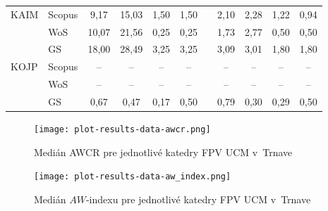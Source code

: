 \begin{table}
\begin{tabularx}{\textwidth}{Xlcccclcccc}
    KAIM & Scopus & 9,17   & 15,03  & 1,50   & 1,50   & & 2,10  & 2,28 & 1,22  & 0,94 \\
         & WoS    & 10,07  & 21,56  & 0,25   & 0,25   & & 1,73  & 2,77 & 0,50  & 0,50 \\
         & GS     & 18,00  & 28,49  & 3,25   & 3,25   & & 3,09  & 3,01 & 1,80  & 1,80 \\[1ex]
    KOJP & Scopus & --     & --     & --     & --     & & --    & --   & --    & --   \\
         & WoS    & --     & --     & --     & --     & & --    & --   & --    & --   \\
         & GS     & 0,67   & 0,47   & 0,17   & 0,50   & & 0,79  & 0,30 & 0,29  & 0,50 \\
    \bottomrule
  \end{tabularx}
\end{table}

\begin{figure}
  \centering
  \texttt{[image: plot-results-data-awcr.png]}
  \caption{Medián AWCR pre jednotlivé katedry FPV UCM v~Trnave}
  \label{fig:awcr.plot}
\end{figure}

\begin{figure}
  \centering
  \texttt{[image: plot-results-data-aw\_index.png]}
  \caption{Medián $AW$-indexu pre jednotlivé katedry FPV UCM v~Trnave}
  \label{fig:aw-index.plot}
\end{figure}

